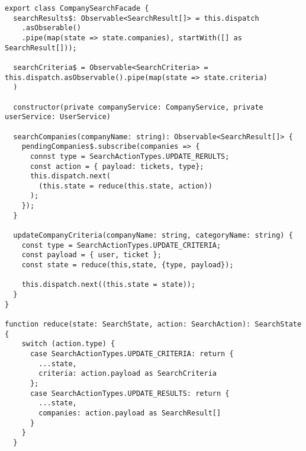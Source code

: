 \begin{lstlisting}[caption=company-search.facade.ts]
export class CompanySearchFacade {
  searchResults$: Observable<SearchResult[]> = this.dispatch
    .asObserable() 
    .pipe(map(state => state.companies), startWith([] as SearchResult[]));

  searchCriteria$ = Observable<SearchCriteria> = this.dispatch.asObservable().pipe(map(state => state.criteria)
  ) 

  constructor(private companyService: CompanyService, private userService: UserService)
    
  searchCompanies(companyName: string): Observable<SearchResult[]> {
    pendingCompanies$.subscribe(companies => {
      connst type = SearchActionTypes.UPDATE_RERULTS;
      const action = { payload: tickets, type};
      this.dispatch.next(
        (this.state = reduce(this.state, action))
      );
    });
  }

  updateCompanyCriteria(companyName: string, categoryName: string) {
    const type = SearchActionTypes.UPDATE_CRITERIA;
    const payload = { user, ticket };
    const state = reduce(this,state, {type, payload});

    this.dispatch.next((this.state = state));
  }
}  

function reduce(state: SearchState, action: SearchAction): SearchState {
    switch (action.type) {
      case SearchActionTypes.UPDATE_CRITERIA: return {
        ...state,
        criteria: action.payload as SearchCriteria
      };
      case SearchActionTypes.UPDATE_RESULTS: return {
        ...state,
        companies: action.payload as SearchResult[]
      }
    }
  }
\end{lstlisting} 
